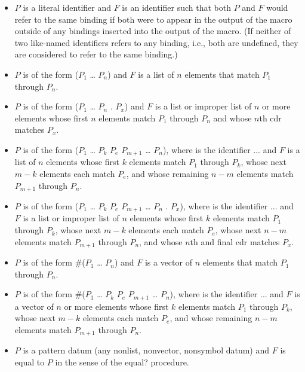\begin{entry}{%
}
\begin{itemize}
\item $P$ is a literal identifier
and $F$ is an identifier such that both $P$ and $F$ would refer to the
same binding if both were to appear in the output of the macro outside
of any bindings inserted into the output of the macro.
(If neither of two like-named identifiers refers to any binding, i.e., both
are undefined, they are considered to refer to the same binding.)

\item $P$ is of the form
{\cf ($P_1$ \dots{} $P_n$)}
and $F$ is a list of $n$ elements that match $P_1$ through
$P_n$.

\item $P$ is of the form
{\cf ($P_1$ \dots{} $P_n$ . $P_x$)}
and $F$ is a list or improper list of $n$ or more elements
whose first $n$ elements match $P_1$ through $P_n$
and
whose $n$th cdr matches $P_x$.

\item $P$ is of the form
{\cf ($P_1$ \dots{} $P_k$ $P_e$  $P_{m+1}$ \dots{} $P_n$)},
where  is the identifier {\cf ...}
and $F$ is a list of $n$
elements whose first $k$ elements match $P_1$ through $P_k$,
whose next $m-k$ elements each match $P_e$,
and
whose remaining $n-m$ elements match $P_{m+1}$ through $P_n$.

\item $P$ is of the form
{\cf ($P_1$ \dots{} $P_k$ $P_e$  $P_{m+1}$ \dots{} $P_n$ . $P_x$)},
where  is the identifier {\cf ...}
and $F$ is a list or improper list of $n$
elements whose first $k$ elements match $P_1$ through $P_k$,
whose next $m-k$ elements each match $P_e$,
whose next $n-m$ elements match $P_{m+1}$ through $P_n$,
and 
whose $n$th and final cdr matches $P_x$.

\item $P$ is of the form
{\cf \#($P_1$ \dots{} $P_n$)}
and $F$ is a vector of $n$ elements that match $P_1$ through
$P_n$.

\item $P$ is of the form
{\cf \#($P_1$ \dots{} $P_k$ $P_e$  $P_{m+1}$ \dots{} $P_n$)},
where  is the identifier {\cf ...}
and $F$ is a vector of $n$ or more elements
whose first $k$ elements match $P_1$ through $P_k$,
whose next $m-k$ elements each match $P_e$,
and
whose remaining $n-m$ elements match $P_{m+1}$ through $P_n$.

\item $P$ is a pattern datum (any nonlist, nonvector, nonsymbol
datum) and $F$ is equal to $P$ in the sense of the
{\cf equal?} procedure.
\end{itemize}


\end{entry}
